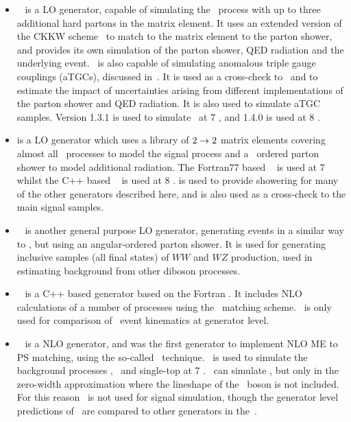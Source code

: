 \begin{itemize}
    \item \sherpa~\cite{Gleisberg:2008ta} is a LO generator, capable of
    simulating the \qqZZ\ process with up to three additional hard partons in the matrix element. It
    uses an extended version of the CKKW scheme~\cite{Hoeche:2009rj} to match to the matrix element to the parton shower,
    and provides its own simulation of the parton shower, QED radiation and
    the underlying event. \sherpa\ is also capable of simulating anomalous
    triple gauge couplings (aTGCs), discussed in~. It is
    used as a cross-check to \powhegbox\ and to estimate the impact
    of uncertainties
    arising from different implementations of the parton shower and QED
    radiation. It is also used to simulate aTGC samples.
    Version 1.3.1 is used to simulate \qqZZllll\ at 7 \tev, and 1.4.0 is used at
    8 \tev.

    \item \pythia is a LO generator which uses a library of $2\rightarrow2$
    matrix elements covering almost all \sm\ processes to model the signal
    process and a \pt\ ordered parton shower to model additional radiation.
    The Fortran77 based
    ~\cite{pythia} is used at 7 \tev\, whilst the C++ based
    ~\cite{Sjostrand:2007gs} is used at 8 \tev. \pythia is used to
    provide showering for many of the other generators described here, and is
    also used as a cross-check to the main signal samples.

    \item \herwig~\cite{Herwig} is another general purpose LO generator, generating events in a
    similar way to \pythia, but using an angular-ordered parton shower.
    It is used for generating inclusive samples (all final
    states) of $WW$ and $WZ$ production, used in estimating background from
    other diboson processes.

    \item \herwigPP~\cite{Bahr:2008pv} is a C++ based generator based on the
    Fortran \herwig. It includes NLO calculations of a number of processes
    using the \powheg\ matching scheme. \herwigPP\ is only used for comparison
    of \ZZ\ event kinematics at generator level.

    \item \mcatnlo~\cite{bib:mcatnlo} is a NLO generator, and was the first
    generator to implement NLO ME to PS matching, using the so-called \mcatnlo\
    technique. \mcatnlo\ is used to simulate the background processes \ttbar,
    \Wt\ and single-top at 7 \tev. \mcatnlo\ can simulate \qqZZ, but only in the
    zero-width approximation where the lineshape of the \Z\ boson is not
    included. For this reason \mcatnlo\ is not used for signal simulation,
    though the generator level predictions of \mcatnlo\ are compared to other
    generators in the~\chap{TheoryZZProduction}.


\end{itemize}
